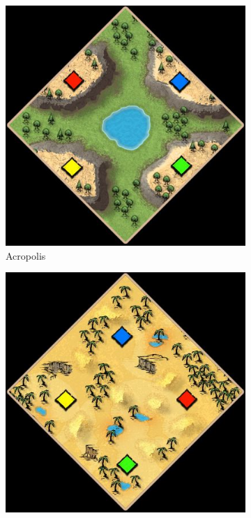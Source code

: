 \begin{figure}
    \begin{subfigure}{0.22\textwidth}
        \centering
        \includegraphics[width=1.0\textwidth]{src/images/maps/rm-acropolis}
        \caption{Acropolis}
    \end{subfigure}\quad%
    \begin{subfigure}{0.22\textwidth}
        \centering
        \includegraphics[width=1.0\textwidth]{src/images/maps/rm-arabia}

\end{subfigure}
\end{figure}
